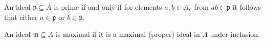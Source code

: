 \begin{prop}
  An ideal \(\mathfrak{p} \subseteq A\) is prime if and only if for elements \(a, b \in A,\) from \(ab \in \mathfrak{p}\) it follows that either \(a \in \mathfrak{p}\) or \(b \in \mathfrak{p}\).

  An ideal \(\mathfrak{m} \subseteq A\) is maximal if it is a maximal (proper) ideal in \(A\) under inclusion.
\end{prop}


